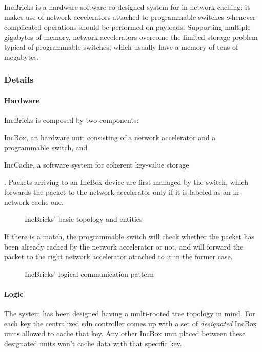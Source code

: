 IncBricks \cite{incbricks} is a hardware-software co-designed system for in-network caching: it makes use of network accelerators attached to programmable switches whenever complicated operations should be performed on payloads.
Supporting multiple gigabytes of memory, network accelerators overcome the limited storage problem typical of programmable switches, which usually have a memory of tens of megabytes.

\subsubsection{Details} \label{incbricks_details}
\paragraph{Hardware}
IncBricks \cite{incbricks} is composed by two components:
\begin{mylist}
    \item IncBox, an hardware unit consisting of a network accelerator and a programmable switch, and
    \item IncCache, a software system for coherent key-value storage
\end{mylist}.
Packets arriving to an IncBox device are first managed by the switch, which forwards the packet to the network accelerator only if it is labeled as an in-network cache one.

\begin{figure}[!htb]
    \centering
    \usebox{\incbricksbasic}
    \caption{IncBricks' \texorpdfstring{\cite{incbricks}}{} basic topology and entities}
\end{figure}

If there is a match, the programmable switch will check whether the packet has been already cached by the network accelerator or not, and will forward the packet to the right network accelerator attached to it in the former case.

\begin{figure}[!htb]
    \centering
    \usebox{\incbrickscommunication}
    \caption{IncBricks' \texorpdfstring{\cite{incbricks}}{} logical communication pattern}
\end{figure}

\paragraph{Logic}
The system has been designed having a multi-rooted tree topology in mind.
For each key the centralized \gls{sdn} controller comes up with a set of \textit{designated} IncBox units allowed to cache that key.
Any other IncBox unit placed between these designated units won't cache data with that specific key.


